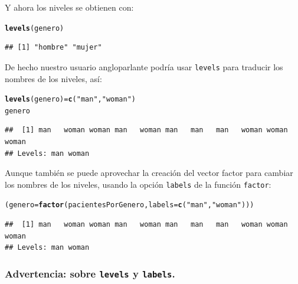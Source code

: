 \documentclass[10pt,a4paper]{article}\usepackage[]{graphicx}\usepackage[]{color}
\makeatletter
\newcommand{\hlstr}[1]{\textcolor[rgb]{0.192,0.494,0.8}{#1}}%
\newcommand{\hlstd}[1]{\textcolor[rgb]{0.345,0.345,0.345}{#1}}%
\newcommand{\hlkwb}[1]{\textcolor[rgb]{0.69,0.353,0.396}{#1}}%
\newcommand{\hlkwc}[1]{\textcolor[rgb]{0.333,0.667,0.333}{#1}}%
\newcommand{\hlkwd}[1]{\textcolor[rgb]{0.737,0.353,0.396}{\textbf{#1}}}%
\newenvironment{kframe}{%
 \def\at@end@of@kframe{}%
 \ifinner\ifhmode%
  \def\at@end@of@kframe{\end{minipage}}%
  \begin{minipage}{\columnwidth}%
 \fi\fi%
 \def\FrameCommand##1{\hskip\@totalleftmargin \hskip-\fboxsep
 \colorbox{shadecolor}{##1}\hskip-\fboxsep
     \hskip-\linewidth \hskip-\@totalleftmargin \hskip\columnwidth}%
 \MakeFramed {\advance\hsize-\width
   \@totalleftmargin\z@ \linewidth\hsize
   \@setminipage}}%
 {\par\unskip\endMakeFramed%
 \at@end@of@kframe}
\newenvironment{knitrout}{}{} %
\makeatother
\begin{document}
Y ahora los niveles se obtienen con:
\begin{knitrout}
\color{fgcolor}\begin{kframe}
\begin{alltt}
\hlkwd{levels}\hlstd{(genero)}
\end{alltt}
\begin{verbatim}
## [1] "hombre" "mujer"
\end{verbatim}
\end{kframe}
\end{knitrout}

De hecho nuestro usuario angloparlante podría usar {\tt levels} para traducir los nombres de los niveles, así:

\begin{knitrout}
\color{fgcolor}\begin{kframe}
\begin{alltt}
\hlkwd{levels}\hlstd{(genero)} \hlkwb{=} \hlkwd{c}\hlstd{(}\hlstr{"man"}\hlstd{,} \hlstr{"woman"}\hlstd{)}
\hlstd{genero}
\end{alltt}
\begin{verbatim}
##  [1] man   woman woman man   woman man   man   man   woman woman woman
## Levels: man woman
\end{verbatim}
\end{kframe}
\end{knitrout}

Aunque también se puede aprovechar la creación del vector factor para cambiar los nombres de los niveles, usando la opción {\tt labels} de la función {\tt factor}:

\begin{knitrout}
\color{fgcolor}\begin{kframe}
\begin{alltt}
\hlstd{(genero} \hlkwb{=} \hlkwd{factor}\hlstd{(pacientesPorGenero,} \hlkwc{labels}\hlstd{=}\hlkwd{c}\hlstd{(}\hlstr{"man"}\hlstd{,} \hlstr{"woman"}\hlstd{)))}
\end{alltt}
\begin{verbatim}
##  [1] man   woman woman man   woman man   man   man   woman woman woman
## Levels: man woman
\end{verbatim}
\end{kframe}
\end{knitrout}

\subsubsection{Advertencia: sobre {\tt levels} y {\tt labels}.}
\end{document}
